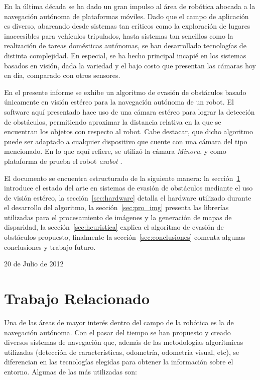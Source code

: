 \documentclass[journal]{IEEEtran}
\begin{document}
En la \'ultima d\'ecada se ha dado un gran impulso al \'area de rob\'otica abocada a la navegaci\'on aut\'onoma de plataformas m\'oviles. Dado que el campo de aplicaci\'on es diverso, abarcando desde sistemas tan cr\'iticos como la exploraci\'on de lugares inaccesibles para veh\'iculos tripulados, hasta sistemas tan sencillos como la realizaci\'on de tareas dom\'esticas aut\'onomas, se han desarrollado tecnolog\'ias de distinta complejidad. En especial, se ha hecho principal incapi\'e en los sistemas basados en visi\'on, dada la variedad y el bajo costo que presentan las c\'amaras hoy en d\'ia, comparado con otros sensores.

En el presente informe se exhibe un algoritmo de evasi\'on de obst\'aculos basado \'unicamente en visi\'on est\'ereo para la navegaci\'on aut\'onoma de un robot. El software aqu\'i presentado hace uso de una c\'amara est\'ereo para lograr la detecci\'on de obst\'aculos, permitiendo aproximar la distancia relativa en la que se encuentran los objetos con respecto al robot. Cabe destacar, que dicho algoritmo puede ser adaptado a cualquier dispositivo que cuente con una c\'amara del tipo mencionado. En lo que aqu\'i refiere, se utiliz\'o la c\'amara \emph{Minoru}, y como plataforma de prueba el robot \emph{exabot} \cite{DPSC09}.


El documento se encuentra estructurado de la siguiente manera: la secci\'on~\ref{sec:trabajajo_relacionado} introduce el estado del arte en sistemas de evasi\'on de obst\'aculos mediante el uso de visi\'on est\'ereo, la secci\'on~\ref{sec:hardware} detalla el hardware utilizado durante el desarrollo del algoritmo, la secci\'on~\ref{sec:pro_img} presenta las librer\'ias utilizadas para el procesamiento de im\'agenes y la generaci\'on de mapas de disparidad, la secci\'on~\ref{sec:heuristica} explica el algoritmo de evasi\'on de obst\'aculos propuesto, finalmente la secci\'on~\ref{sec:conclusiones} comenta algunas conclusiones y trabajo futuro.
\medskip

\hfill 20 de Julio de 2012

\section{Trabajo Relacionado}
\label{sec:trabajajo_relacionado}

Una de las \'areas de mayor inter\'es dentro del campo de la rob\'otica es la de navegaci\'on aut\'onoma. Con el pasar del tiempo se han propuesto y creado diversos sistemas de navegaci\'on que, adem\'as de las metodolog\'ias algor\'itmicas utilizadas (detecci\'on de caracter\'isticas, odometr\'ia, odometr\'ia visual, etc), se diferencian en las tecnolog\'ias elegidas para obtener la informaci\'on sobre el entorno. Algunas de las m\'as utilizadas son:
\end{document}

